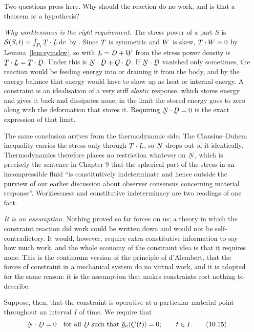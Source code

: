 \begin{remark}
\label{rem:ch10workless}
Two questions press here. Why should the reaction do no work, and is that
a theorem or a hypothesis?

\emph{Why worklessness is the right requirement.} The stress power of a
part $S$ is $\mathcal{S}(S,t)=\int_{P_{t}}\bT\cdot\bL\,\dl v$ by
. Since $\bT$ is symmetric and $\bW$ is skew,
$\bT\cdot\bW=0$ by Lemma~\ref{lem:symskw}, so with $\bL=\bD+\bW$ from
 the stress power density is $\bT\cdot\bL=\bT\cdot\bD$. Under
 this is $\bN\cdot\bD+\bG\cdot\bD$. If $\bN\cdot\bD$ vanished
only sometimes, the reaction would be feeding energy into or draining it
from the body, and by the energy balance  that energy would
have to show up as heat or internal energy. A constraint is an
idealisation of a very stiff \emph{elastic} response, which stores energy
and gives it back and dissipates none; in the limit the stored energy
goes to zero along with the deformation that stores it. Requiring
$\bN\cdot\bD=0$ is the exact expression of that limit.

The same conclusion arrives from the thermodynamic side. The
Clausius--Duhem inequality carries the stress only through $\bT\cdot\bL$,
so $\bN$ drops out of it identically. Thermodynamics therefore places no
restriction whatever on $\bN$, which is precisely the sentence in Chapter
9 that the spherical part of the stress in an incompressible fluid ``is
constitutively indeterminate and hence outside the purview of our earlier
discussion about observer consensus concerning material response''.
Worklessness and constitutive indeterminacy are two readings of one fact.

\emph{It is an assumption.} Nothing proved so far forces  on
us; a theory in which the constraint reaction did work could be written
down and would not be self-contradictory. It would, however, require
extra constitutive information to say how much work, and the whole
economy of the constraint idea is that it requires none. This is the
continuum version of the principle of d'Alembert, that the forces of
constraint in a mechanical system do no virtual work, and it is adopted
for the same reason: it is the assumption that makes constraints cost
nothing to describe.
\end{remark}

Suppose, then, that the constraint is operative at a particular material
point throughout an interval $I$ of time. We require that
\begin{equation}
   \bN\cdot\bD=0\quad\text{for all }\bD\text{ such that }
   \bar g_{\kappa}(\bC(t))=0;\qquad t\in I .
   \tag{10.15}\label{eq:10.15}
\end{equation}


